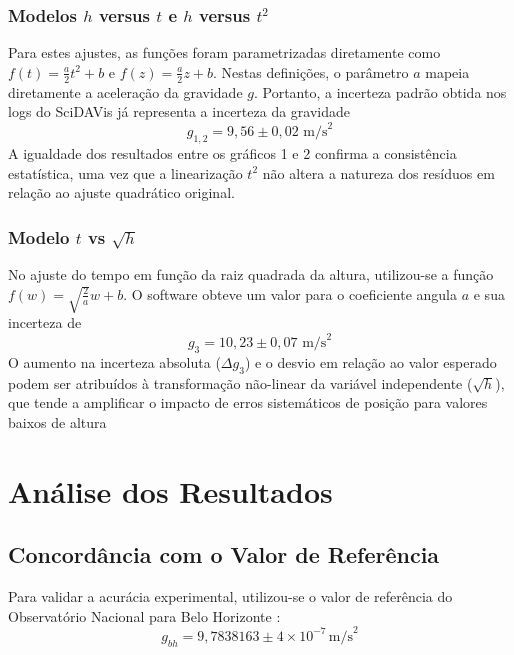 \documentclass[12pt,a4paper]{article}
\begin{document}
\subsubsection{Modelos $h$ versus $t$ e $h$ versus $t^2$}
Para estes ajustes, as funções foram parametrizadas diretamente como $f(t) = \frac{a}{2}t^2 + b$ e $f(z) = \frac{a}{2}z + b$. Nestas definições, o parâmetro $a$ mapeia diretamente a aceleração da gravidade $g$. Portanto, a incerteza padrão obtida nos logs do SciDAVis já representa a incerteza da gravidade
\begin{equation*}
    g_{1,2} = 9{,}56 \pm 0{,}02 \text{ m/s}^2
\end{equation*}
A igualdade dos resultados entre os gráficos 1 e 2 confirma a consistência estatística, uma vez que a linearização $t^2$ não altera a natureza dos resíduos em relação ao ajuste quadrático original.

\subsubsection{Modelo $t$ vs $\sqrt{h}$}
No ajuste do tempo em função da raiz quadrada da altura, utilizou-se a função $f(w) = \sqrt{\frac{2}{a}}w + b$. O software obteve um valor para o coeficiente angula $a$ e sua incerteza de
\begin{equation*}
    g_3 = 10{,}23 \pm 0{,}07 \text{ m/s}^2
\end{equation*}
O aumento na incerteza absoluta ($\Delta g_3$) e o desvio em relação ao valor esperado podem ser atribuídos à transformação não-linear da variável independente ($\sqrt{h}$), que tende a amplificar o impacto de erros sistemáticos de posição para valores baixos de altura

\section{Análise dos Resultados}

\subsection{Concordância com o Valor de Referência}

Para validar a acurácia experimental, utilizou-se o valor de referência do Observatório Nacional para Belo Horizonte \citep{on_gravimetria_bh_1981}:
\begin{equation}
    g_{bh} = 9{,}7838163 \pm 4\times10^{-7}\,\text{m/s}^2
\end{equation}
\end{document}
